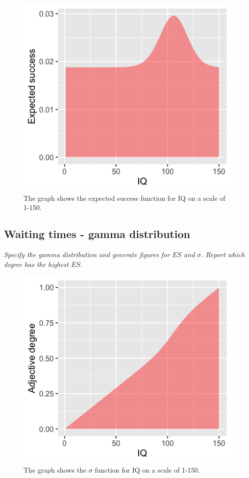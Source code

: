 \documentclass[11pt,a4paper,oneside]{article}
\begin{document}
\begin{figure}[H]
    \centering
    \includegraphics[width=\textwidth]{figs/Question_2_IQ_es.png}
    \caption{The graph shows the expected success function for IQ on a scale of 1-150.}
  \label{fig:q2_iq_es}
\end{figure}


\subsection{Waiting times - gamma distribution}
\textit{Specify the gamma distribution and generate figures for $ES$ and $\sigma$. Report which degree has the highest $ES$.}\\

\begin{figure}[H]
    \centering
    \includegraphics[width=\textwidth]{figs/Question_2_IQ_sigma.png}
    \caption{The graph shows the $\sigma$ function for IQ on a scale of 1-150.}
  \label{fig:q2_iq_sigma}
\end{figure}
\end{document}
